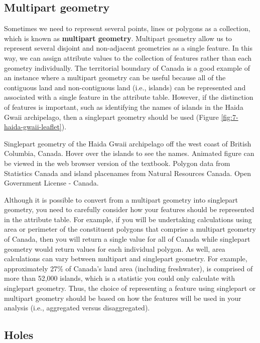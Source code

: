 \documentclass[
]{book}
\begin{document}
\hypertarget{multipart-geometry}{%
\subsection{Multipart geometry}\label{multipart-geometry}}

Sometimes we need to represent several points, lines or polygons as a collection, which is known as \textbf{multipart geometry}. Multipart geometry allow us to represent several disjoint and non-adjacent geometries as a single feature. In this way, we can assign attribute values to the collection of features rather than each geometry individually. The territorial boundary of Canada is a good example of an instance where a multipart geometry can be useful because all of the contiguous land and non-contiguous land (i.e., islands) can be represented and associated with a single feature in the attribute table. However, if the distinction of features is important, such as identifying the names of islands in the Haida Gwaii archipelago, then a singlepart geometry should be used (Figure \ref{fig:7-haida-gwaii-leaflet}).

\label{fig:7-haida-gwaii-leaflet}Singlepart geometry of the Haida Gwaii archipelago off the west coast of British Columbia, Canada. Hover over the islands to see the names. Animated figure can be viewed in the web browser version of the textbook. Polygon data from Statistics Canada and island placenames from Natural Resources Canada. Open Government License - Canada.

Although it is possible to convert from a multipart geometry into singlepart geometry, you need to carefully consider how your features should be represented in the attribute table. For example, if you will be undertaking calculations using area or perimeter of the constituent polygons that comprise a multipart geometry of Canada, then you will return a single value for all of Canada while singlepart geometry would return values for each individual polygon. As well, area calculations can vary between multipart and singlepart geometry. For example, approximately 27\% of Canada's land area (including freshwater), is comprised of more than 52,000 islands, which is a statistic you could only calculate with singlepart geometry. Thus, the choice of representing a feature using singlepart or multipart geometry should be based on how the features will be used in your analysis (i.e., aggregated versus disaggregated).

\hypertarget{holes}{%
\subsection{Holes}\label{holes}}
\end{document}
